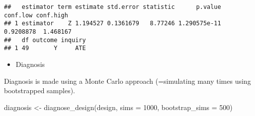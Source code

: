 \documentclass[
]{book}
\newenvironment{Shaded}{\begin{snugshade}}{\end{snugshade}}
\newcommand{\AttributeTok}[1]{\textcolor[rgb]{0.77,0.63,0.00}{#1}}
\newcommand{\DecValTok}[1]{\textcolor[rgb]{0.00,0.00,0.81}{#1}}
\newcommand{\FunctionTok}[1]{\textcolor[rgb]{0.00,0.00,0.00}{#1}}
\newcommand{\NormalTok}[1]{#1}
\newcommand{\OtherTok}[1]{\textcolor[rgb]{0.56,0.35,0.01}{#1}}
\providecommand{\tightlist}{%
  \setlength{\itemsep}{0pt}\setlength{\parskip}{0pt}}
\begin{document}
\begin{verbatim}
##   estimator term estimate std.error statistic      p.value  conf.low conf.high
## 1 estimator    Z 1.194527 0.1361679   8.77246 1.290575e-11 0.9208878  1.468167
##   df outcome inquiry
## 1 49       Y     ATE
\end{verbatim}

\begin{itemize}
\tightlist
\item
  Diagnosis
\end{itemize}

Diagnosis is made using a Monte Carlo approach (=simulating many times using bootstrapped samples).

\begin{Shaded}
\begin{Highlighting}[]
\NormalTok{diagnosis }\OtherTok{\textless{}{-}} \FunctionTok{diagnose\_design}\NormalTok{(design, }
                             \AttributeTok{sims =} \DecValTok{1000}\NormalTok{, }
                             \AttributeTok{bootstrap\_sims =} \DecValTok{500}\NormalTok{)}
\end{Highlighting}
\end{Shaded}
\end{document}
